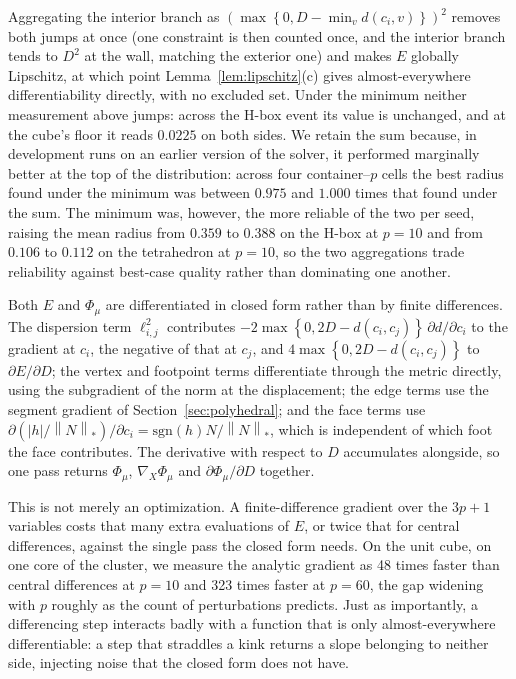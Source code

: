 \documentclass[preprint,12pt]{elsarticle}
\theoremstyle{remark}
\newcommand{\set}[1]{\left\{ #1 \right\}}
\def \abs#1{\left| #1 \right|}
\def \norm#1{\left\|#1 \right\|}
\newcommand{\paren}[1]{\left( #1 \right)}
\begin{document}
Aggregating the interior branch as $\paren{\max \set{0, D - \min_v d(c_i,
v)}}^2$ removes both jumps at once (one constraint is then counted once, and the
interior branch tends to $D^2$ at the wall, matching the exterior one) and makes
$E$ globally Lipschitz, at which point Lemma~\ref{lem:lipschitz}(c) gives
almost-everywhere differentiability directly, with no excluded set. Under the
minimum neither measurement above jumps: across the H-box event its value is
unchanged, and at the cube's floor it reads $0.0225$ on both sides. We retain
the sum because, in development runs on an earlier version of the solver, it
performed marginally better at the top of the distribution: across four
container--$p$ cells the best radius found under the minimum was between $0.975$
and $1.000$ times that found under the sum. The minimum was, however, the more
reliable of the two per seed, raising the mean radius from $0.359$ to $0.388$ on
the H-box at $p = 10$ and from $0.106$ to $0.112$ on the tetrahedron at $p =
10$, so the two aggregations trade reliability against best-case quality rather
than dominating one another.

Both $E$ and $\Phi_\mu$ are differentiated in closed form rather than by finite
differences. The dispersion term $\ell_{i,j}^2$ contributes $-2 \max \set{0, 2D
- d(c_i,c_j)} \, \partial d / \partial c_i$ to the gradient at $c_i$, the
negative of that at $c_j$, and $4 \max \set{0, 2D - d(c_i,c_j)}$ to $\partial E
/ \partial D$; the vertex and footpoint terms differentiate through the metric
directly, using the subgradient of the norm at the displacement; the edge terms
use the segment gradient of Section~\ref{sec:polyhedral}; and the face terms use
$\partial \paren{\abs{h} / \norm{N}_*} / \partial c_i = \mathrm{sgn}(h) N /
\norm{N}_*$, which is independent of which foot the face contributes. The
derivative with respect to $D$ accumulates alongside, so one pass returns
$\Phi_\mu$, $\nabla_X \Phi_\mu$ and $\partial \Phi_\mu / \partial D$ together.

This is not merely an optimization. A finite-difference gradient over the $3p +
1$ variables costs that many extra evaluations of $E$, or twice that for central
differences, against the single pass the closed form needs. On the unit cube, on
one core of the cluster, we measure the analytic gradient as 48 times faster
than central differences at $p = 10$ and 323 times faster at $p = 60$, the gap
widening with $p$ roughly as the count of perturbations predicts. Just as
importantly, a differencing step interacts badly with a function that is only
almost-everywhere differentiable: a step that straddles a kink returns a slope
belonging to neither side, injecting noise that the closed form does not have.
\end{document}
